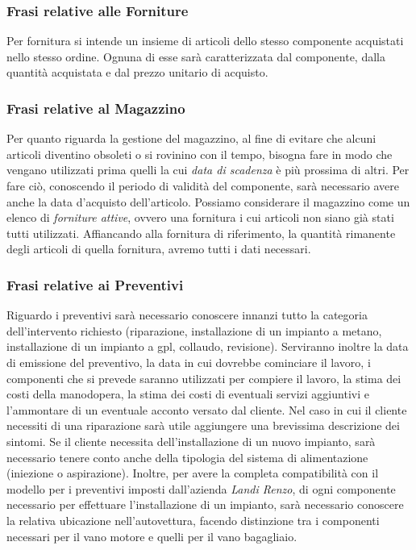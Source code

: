 		\subsubsection{Frasi relative alle Forniture}
		
			Per fornitura si intende un insieme di articoli dello stesso componente acquistati nello stesso ordine. Ognuna di esse sarà caratterizzata dal componente, dalla quantità acquistata e dal prezzo unitario di acquisto.
			
		\subsubsection{Frasi relative al Magazzino}
			
			Per quanto riguarda la gestione del magazzino, al fine di evitare che alcuni articoli diventino obsoleti o si rovinino con il tempo, bisogna fare in modo che vengano utilizzati prima quelli la cui \emph{data di scadenza} è più prossima di altri. Per fare ciò, conoscendo il periodo di validità del componente, sarà necessario avere anche la data d'acquisto dell'articolo.
			Possiamo considerare il magazzino come un elenco di \emph{forniture attive}, ovvero una fornitura i cui articoli non siano già stati tutti utilizzati. Affiancando alla fornitura di riferimento, la quantità rimanente degli articoli di quella fornitura, avremo tutti i dati necessari.
			
		\subsubsection{Frasi relative ai Preventivi}
		\label{sec:frasi_preventivi}
			
			Riguardo i preventivi sarà necessario conoscere innanzi tutto la categoria dell'intervento richiesto (riparazione, installazione di un impianto a metano, installazione di un impianto a gpl, collaudo, revisione). Serviranno inoltre la data di emissione del preventivo, la data in cui dovrebbe cominciare il lavoro, i componenti che si prevede saranno utilizzati per compiere il lavoro, la stima dei costi della manodopera, la stima dei costi di eventuali servizi aggiuntivi e l'ammontare di un eventuale acconto versato dal cliente.
			Nel caso in cui il cliente necessiti di una riparazione sarà utile aggiungere una brevissima descrizione dei sintomi.
			Se il cliente necessita dell’installazione di un nuovo impianto, sarà necessario tenere conto anche della tipologia del sistema di alimentazione (iniezione o aspirazione). Inoltre, per avere la completa compatibilità con il modello per i preventivi imposti dall'azienda \emph{Landi Renzo}, di ogni componente necessario per effettuare l'installazione di un impianto, sarà necessario conoscere la relativa ubicazione nell'autovettura, facendo distinzione tra i componenti necessari per il vano motore e quelli per il vano bagagliaio.
			

